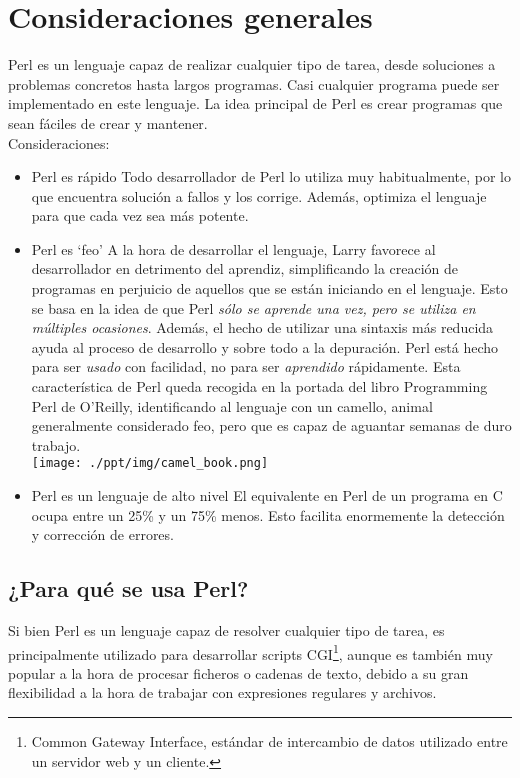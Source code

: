 \documentclass[12pt,a4paper]{memoir} %
\begin{document}
	\section{Consideraciones generales}
	Perl es un lenguaje capaz de realizar cualquier tipo de tarea, desde soluciones a problemas concretos hasta largos programas. Casi cualquier programa puede ser implementado en este lenguaje. La idea principal de Perl es crear programas que sean fáciles de crear y mantener.\\
	Consideraciones:
	\begin{itemize}
	\item Perl es rápido
	\subitem Todo desarrollador de Perl lo utiliza muy habitualmente, por lo que encuentra solución a fallos y los corrige. Además, optimiza el lenguaje para que cada vez sea más potente.
	\item Perl es `feo'
	\subitem A la hora de desarrollar el lenguaje, Larry favorece al desarrollador en detrimento del aprendiz, simplificando la creación de programas en perjuicio de aquellos que se están iniciando en el lenguaje. Esto se basa en la idea de que Perl \emph{sólo se aprende una vez, pero se utiliza en múltiples ocasiones}. Además, el hecho de utilizar una sintaxis más reducida ayuda al proceso de desarrollo y sobre todo a la depuración. Perl está hecho para ser \textit{usado} con facilidad, no para ser \textit{aprendido} rápidamente. Esta característica de Perl queda recogida en la portada del libro Programming Perl de O'Reilly, identificando al lenguaje con un camello, animal generalmente considerado feo, pero que es capaz de aguantar semanas de duro trabajo. \\
	\texttt{[image: ./ppt/img/camel\_book.png]}
	\item Perl es un lenguaje de alto nivel
	\subitem El equivalente en Perl de un programa en C ocupa entre un 25\% y un 75\% menos. Esto facilita enormemente la detección y corrección de errores.
	\end{itemize}
	\subsection{¿Para qué se usa Perl?}
	Si bien Perl es un lenguaje capaz de resolver cualquier tipo de tarea, es principalmente utilizado para desarrollar scripts CGI\footnote{Common Gateway Interface, estándar de intercambio de datos utilizado entre un servidor web y un cliente.}, aunque es también muy popular a la hora de procesar ficheros o cadenas de texto, debido a su gran flexibilidad a la hora de trabajar con expresiones regulares y archivos.
\end{document}
